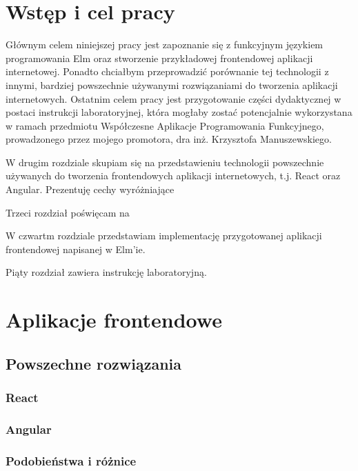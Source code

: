 \documentclass[twoside,a4paper]{report}
\begin{document}

\chapter{Wstęp i cel pracy}
Głównym celem niniejszej pracy jest zapoznanie się z funkcyjnym językiem programowania Elm oraz stworzenie przykładowej frontendowej aplikacji internetowej.
Ponadto chciałbym przeprowadzić porównanie tej technologii z innymi, bardziej powszechnie używanymi rozwiązaniami do tworzenia aplikacji internetowych.
Ostatnim celem pracy jest przygotowanie części dydaktycznej w postaci instrukcji laboratoryjnej, która mogłaby zostać potencjalnie wykorzystana w ramach przedmiotu Współczesne Aplikacje Programowania Funkcyjnego, prowadzonego przez mojego promotora, dra inż. Krzysztofa Manuszewskiego.

W drugim rozdziale skupiam się na przedstawieniu technologii powszechnie używanych do tworzenia frontendowych aplikacji internetowych, t.j. React oraz Angular.
Prezentuję cechy wyróżniające

Trzeci rozdział poświęcam na

W czwartm rozdziale przedstawiam implementację przygotowanej aplikacji frontendowej napisanej w Elm'ie.

Piąty rozdział zawiera instrukcję laboratoryjną.


\chapter{Aplikacje frontendowe}

\section{Powszechne rozwiązania}

\subsection{React}
\cite{react}
\cite{reactdocs}
\subsection{Angular}
\cite{angularjs}
\cite{angulardocs}
\subsection{Podobieństwa i różnice}
\end{document}
